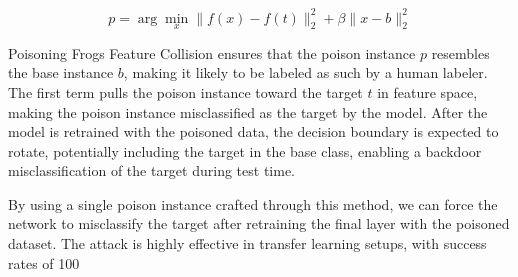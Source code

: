 \begin{equation}
p = \arg\min_x \|f(x) - f(t)\|_2^2 + \beta \|x - b\|_2^2
\end{equation}

Poisoning Frogs Feature Collision ensures that the poison instance $p$ resembles the base instance $b$, making it likely to be labeled as such by a human labeler. The first term pulls the poison instance toward the target $t$ in feature space, making the poison instance misclassified as the target by the model. After the model is retrained with the poisoned data, the decision boundary is expected to rotate, potentially including the target in the base class, enabling a backdoor misclassification of the target during test time.

By using a single poison instance crafted through this method, we can force the network to misclassify the target after retraining the final layer with the poisoned dataset. The attack is highly effective in transfer learning setups, with success rates of 100\